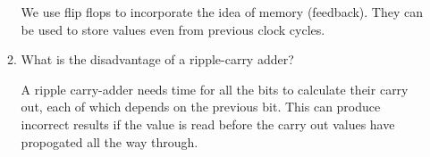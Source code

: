 \documentclass[10pt]{article}
\begin{document}
\begin{itemize}
\begin{enumerate}
We use flip flops to incorporate the idea of memory (feedback).  They can be used to store values even from previous clock cycles.

\item What is the disadvantage of a ripple-carry adder?

A ripple carry-adder needs time for all the bits to calculate their carry out, each of which depends on the previous bit.  This can produce incorrect results if the value is read before the carry out values have propogated all the way through.

\end{enumerate}

\end{itemize}
\end{document}
